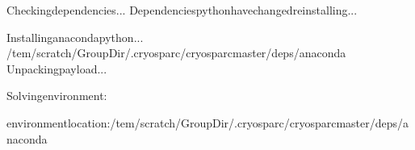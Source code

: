 \documentclass[a4paper,11pt,english]{sphinxmanual}
\begin{document}
\begin{sphinxVerbatim}[commandchars=\\\{\}]
Checkingdependencies...
Dependenciespythonhavechanged\PYGZhy{}reinstalling...
\PYGZhy{}\PYGZhy{}\PYGZhy{}\PYGZhy{}\PYGZhy{}\PYGZhy{}\PYGZhy{}\PYGZhy{}\PYGZhy{}\PYGZhy{}\PYGZhy{}\PYGZhy{}\PYGZhy{}\PYGZhy{}\PYGZhy{}\PYGZhy{}\PYGZhy{}\PYGZhy{}\PYGZhy{}\PYGZhy{}\PYGZhy{}\PYGZhy{}\PYGZhy{}\PYGZhy{}\PYGZhy{}\PYGZhy{}\PYGZhy{}\PYGZhy{}\PYGZhy{}\PYGZhy{}\PYGZhy{}\PYGZhy{}\PYGZhy{}\PYGZhy{}\PYGZhy{}\PYGZhy{}\PYGZhy{}\PYGZhy{}\PYGZhy{}\PYGZhy{}\PYGZhy{}\PYGZhy{}\PYGZhy{}\PYGZhy{}\PYGZhy{}\PYGZhy{}\PYGZhy{}\PYGZhy{}\PYGZhy{}\PYGZhy{}\PYGZhy{}\PYGZhy{}\PYGZhy{}\PYGZhy{}\PYGZhy{}\PYGZhy{}\PYGZhy{}\PYGZhy{}\PYGZhy{}\PYGZhy{}\PYGZhy{}\PYGZhy{}\PYGZhy{}\PYGZhy{}\PYGZhy{}\PYGZhy{}\PYGZhy{}\PYGZhy{}\PYGZhy{}\PYGZhy{}\PYGZhy{}\PYGZhy{}

Installinganacondapython...
\PYGZhy{}\PYGZhy{}\PYGZhy{}\PYGZhy{}\PYGZhy{}\PYGZhy{}\PYGZhy{}\PYGZhy{}\PYGZhy{}\PYGZhy{}\PYGZhy{}\PYGZhy{}\PYGZhy{}\PYGZhy{}\PYGZhy{}\PYGZhy{}\PYGZhy{}\PYGZhy{}\PYGZhy{}\PYGZhy{}\PYGZhy{}\PYGZhy{}\PYGZhy{}\PYGZhy{}\PYGZhy{}\PYGZhy{}\PYGZhy{}\PYGZhy{}\PYGZhy{}\PYGZhy{}\PYGZhy{}\PYGZhy{}\PYGZhy{}\PYGZhy{}\PYGZhy{}\PYGZhy{}\PYGZhy{}\PYGZhy{}\PYGZhy{}\PYGZhy{}\PYGZhy{}\PYGZhy{}\PYGZhy{}\PYGZhy{}\PYGZhy{}\PYGZhy{}\PYGZhy{}\PYGZhy{}\PYGZhy{}\PYGZhy{}\PYGZhy{}\PYGZhy{}\PYGZhy{}\PYGZhy{}\PYGZhy{}\PYGZhy{}\PYGZhy{}\PYGZhy{}\PYGZhy{}\PYGZhy{}\PYGZhy{}\PYGZhy{}\PYGZhy{}\PYGZhy{}\PYGZhy{}\PYGZhy{}\PYGZhy{}\PYGZhy{}\PYGZhy{}\PYGZhy{}\PYGZhy{}\PYGZhy{}
/tem/scratch/\PYGZlt{}GroupDir\PYGZgt{}/.cryosparc/cryosparc\PYGZus{}master/deps/anaconda
Unpackingpayload...

Solvingenvironment:


environmentlocation:/tem/scratch/\PYGZlt{}GroupDir\PYGZgt{}/.cryosparc/cryosparc\PYGZus{}master/deps/anaconda


\end{sphinxVerbatim}
\end{document}
